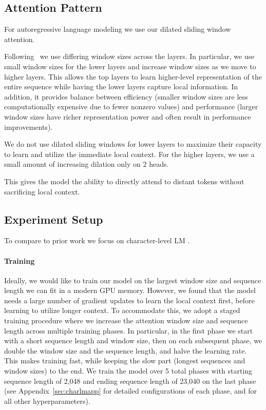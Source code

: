 \subsection{Attention Pattern}
\label{sec:charlm_attn}
For autoregressive language modeling we use our dilated sliding window attention. 

Following~\citet{adaptivespan} we use differing window sizes across the layers. In particular, we use small window sizes for the lower layers and increase window sizes as we move to higher layers. This allows the top layers to learn higher-level representation of the entire sequence while having the lower layers capture local information. In addition, it provides balance between efficiency (smaller window sizes are less computationally expensive due to fewer nonzero values) and performance (larger window sizes have richer representation power and often result in performance improvements). 

We do not use dilated sliding windows for lower layers to maximize their capacity to learn and utilize the immediate local context. For the higher layers, we use a small amount of increasing dilation only on 2 heads.

This gives the model the ability to directly attend to distant tokens without sacrificing local context.

\subsection{Experiment Setup}

To compare to prior work we focus on character-level LM \cite[\texttt{text8} and \texttt{enwik8};][]{text8}.

\paragraph{Training}
Ideally, we would like to train our model on the largest window size and sequence length we can fit in a modern GPU memory. However, we found that the model needs a large number of gradient updates to learn the local context first, before learning to utilize longer context. To accommodate this, we adopt a staged training procedure where we increase the attention window size and sequence length across multiple training phases. In particular, in the first phase we start with a short sequence length and window size, then on each subsequent phase, we double the window size and the sequence length, and halve the learning rate. This makes training fast, while keeping the slow part (longest sequences and window sizes) to the end. We train the model over 5 total phases with starting sequence length of 2,048 and ending sequence length of 23,040 on the last phase (see Appendix~\ref{sec:charlmapp} for detailed configurations of each phase, and for all other hyperparameters).

